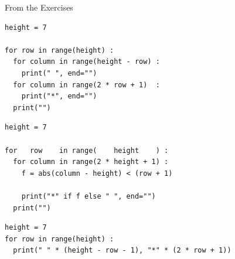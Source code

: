 \begin{frame}[fragile]{From the Exercises}
%
\begin{tcbraster}[raster columns=2,
                  raster equal height,
                  nobeforeafter,
                  raster column skip=0.5cm]
\begin{codebox}
\begin{verbatim}
height = 7

for row in range(height) :
  for column in range(height - row) :
    print(" ", end="")
  for column in range(2 * row + 1)  :
    print("*", end="")
  print("")
\end{verbatim}
\end{codebox}
%
\begin{codebox}
\begin{verbatim}
height = 7

for   row    in range(    height    ) :
  for column in range(2 * height + 1) :
    f = abs(column - height) < (row + 1)
    
    print("*" if f else " ", end="")
  print("")
\end{verbatim}
\end{codebox}
\end{tcbraster}
%
\begin{codebox}
\begin{verbatim}
height = 7
for row in range(height) :
  print(" " * (height - row - 1), "*" * (2 * row + 1))
\end{verbatim}
\end{codebox}
%
\end{frame}


